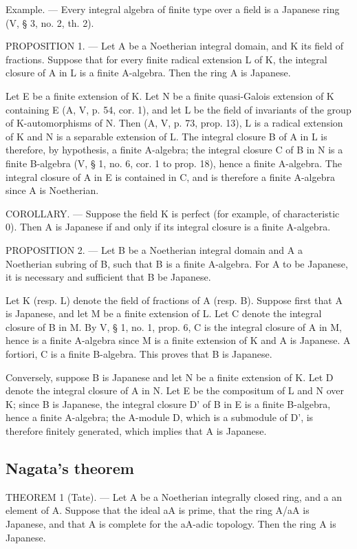 Example. --- Every integral algebra of finite type over a field is a Japanese ring (V, § 3, no. 2, th. 2).

PROPOSITION 1. --- Let A be a Noetherian integral domain, and K its field of fractions. Suppose that for every finite radical extension L of K, the integral closure of A in L is a finite A-algebra. Then the ring A is Japanese.

Let E be a finite extension of K. Let N be a finite quasi-Galois extension of K containing E (A, V, p. 54, cor. 1), and let L be the field of invariants of the group of K-automorphisms of N. Then (A, V, p. 73, prop. 13), L is a radical extension of K and N is a separable extension of L. The integral closure B of A in L is therefore, by hypothesis, a finite A-algebra; the integral closure C of B in N is a finite B-algebra (V, § 1, no. 6, cor. 1 to prop. 18), hence a finite A-algebra. The integral closure of A in E is contained in C, and is therefore a finite A-algebra since A is Noetherian.

COROLLARY. --- Suppose the field K is perfect (for example, of characteristic 0). Then A is Japanese if and only if its integral closure is a finite A-algebra.

PROPOSITION 2. --- Let B be a Noetherian integral domain and A a Noetherian subring of B, such that B is a finite A-algebra. For A to be Japanese, it is necessary and sufficient that B be Japanese.

Let K (resp. L) denote the field of fractions of A (resp. B). Suppose first that A is Japanese, and let M be a finite extension of L. Let C denote the integral closure of B in M. By V, § 1, no. 1, prop. 6, C is the integral closure of A in M, hence is a finite A-algebra since M is a finite extension of K and A is Japanese. A fortiori, C is a finite B-algebra. This proves that B is Japanese.

Conversely, suppose B is Japanese and let N be a finite extension of K. Let D denote the integral closure of A in N. Let E be the compositum of L and N over K; since B is Japanese, the integral closure D' of B in E is a finite B-algebra, hence a finite A-algebra; the A-module D, which is a submodule of D', is therefore finitely generated, which implies that A is Japanese.

\subsection{Nagata's theorem}

THEOREM 1 (Tate). --- Let A be a Noetherian integrally closed ring, and a an element of A. Suppose that the ideal aA is prime, that the ring A/aA is Japanese, and that A is complete for the aA-adic topology. Then the ring A is Japanese.

